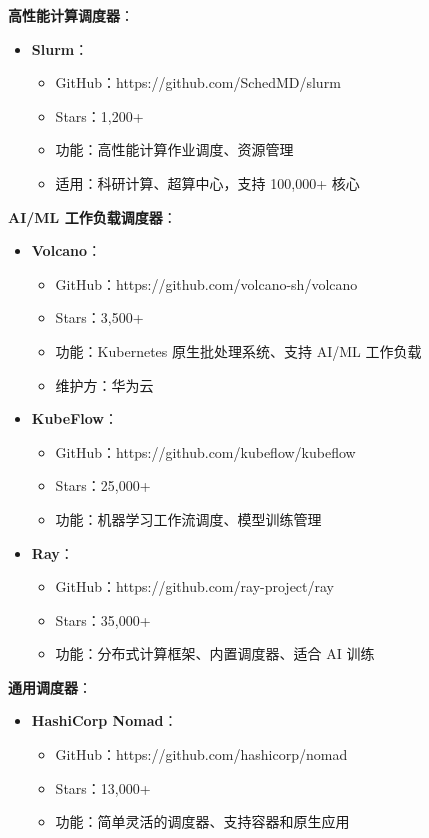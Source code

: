 \documentclass[12pt,a4paper]{article}
\begin{document}
\textbf{高性能计算调度器}：

\begin{itemize}
    \item \textbf{Slurm}：
    \begin{itemize}
        \item GitHub：https://github.com/SchedMD/slurm
        \item Stars：1,200+
        \item 功能：高性能计算作业调度、资源管理
        \item 适用：科研计算、超算中心，支持 100,000+ 核心
    \end{itemize}
\end{itemize}

\textbf{AI/ML 工作负载调度器}：

\begin{itemize}
    \item \textbf{Volcano}：
    \begin{itemize}
        \item GitHub：https://github.com/volcano-sh/volcano
        \item Stars：3,500+
        \item 功能：Kubernetes 原生批处理系统、支持 AI/ML 工作负载
        \item 维护方：华为云
    \end{itemize}
    
    \item \textbf{KubeFlow}：
    \begin{itemize}
        \item GitHub：https://github.com/kubeflow/kubeflow
        \item Stars：25,000+
        \item 功能：机器学习工作流调度、模型训练管理
    \end{itemize}
    
    \item \textbf{Ray}：
    \begin{itemize}
        \item GitHub：https://github.com/ray-project/ray
        \item Stars：35,000+
        \item 功能：分布式计算框架、内置调度器、适合 AI 训练
    \end{itemize}
\end{itemize}

\textbf{通用调度器}：

\begin{itemize}
    \item \textbf{HashiCorp Nomad}：
    \begin{itemize}
        \item GitHub：https://github.com/hashicorp/nomad
        \item Stars：13,000+
        \item 功能：简单灵活的调度器、支持容器和原生应用
    \end{itemize}
\end{itemize}
\end{document}
